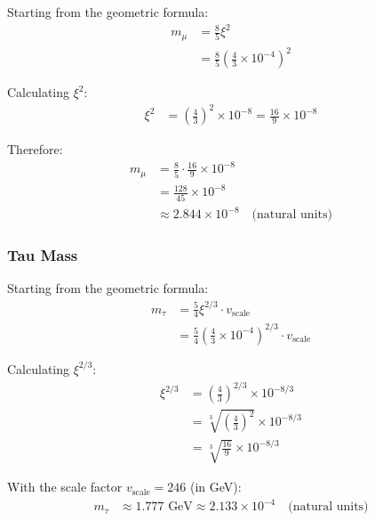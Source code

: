 \documentclass[12pt,a4paper]{article}
\newcommand{\xipar}{\xi}  %
\begin{document}
	\begin{keyresult}
		Starting from the geometric formula:
		\begin{align}
			m_\mu &= \frac{8}{5} \xipar^{2} \\
			&= \frac{8}{5} \left(\frac{4}{3} \times 10^{-4}\right)^{2}
		\end{align}
		
		Calculating $\xipar^{2}$:
		\begin{align}
			\xipar^{2} &= \left(\frac{4}{3}\right)^{2} \times 10^{-8} = \frac{16}{9} \times 10^{-8}
		\end{align}
		
		Therefore:
		\begin{align}
			m_\mu &= \frac{8}{5} \cdot \frac{16}{9} \times 10^{-8} \\
			&= \frac{128}{45} \times 10^{-8} \\
			&\approx 2.844 \times 10^{-8} \quad \text{(natural units)}
		\end{align}
	\end{keyresult}
	
	\subsubsection{Tau Mass}
	
	\begin{keyresult}
		Starting from the geometric formula:
		\begin{align}
			m_\tau &= \frac{5}{4} \xipar^{2/3} \cdot v_{\text{scale}} \\
			&= \frac{5}{4} \left(\frac{4}{3} \times 10^{-4}\right)^{2/3} \cdot v_{\text{scale}}
		\end{align}
		
		Calculating $\xipar^{2/3}$:
		\begin{align}
			\xipar^{2/3} &= \left(\frac{4}{3}\right)^{2/3} \times 10^{-8/3} \\
			&= \sqrt[3]{\left(\frac{4}{3}\right)^2} \times 10^{-8/3} \\
			&= \sqrt[3]{\frac{16}{9}} \times 10^{-8/3}
		\end{align}
		
		With the scale factor $v_{\text{scale}} = 246$ (in GeV):
		\begin{align}
			m_\tau &\approx 1.777 \text{ GeV} \approx 2.133 \times 10^{-4} \quad \text{(natural units)}
		\end{align}
	\end{keyresult}
	
\end{document}
